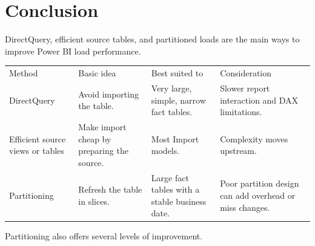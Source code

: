 \documentclass[10pt,openany,10pt]{book}
\newcounter{none}
\let\podeToprule\toprule
\let\podeMidrule\midrule
\let\podeBottomrule\bottomrule
\renewcommand{\toprule}{\arrayrulecolor{pbiGrid}\podeToprule}
\renewcommand{\midrule}{\arrayrulecolor{pbiGrid}\podeMidrule}
\renewcommand{\bottomrule}{\arrayrulecolor{pbiGrid}\podeBottomrule}
\begin{document}
\section{Conclusion}\label{conclusion-5}

DirectQuery, efficient source tables, and partitioned loads are the main
ways to improve Power BI load performance.

{\def\LTcaptype{none} %
\begin{longtable}[]{@{}
  >{\raggedright\arraybackslash}p{}
  >{\raggedright\arraybackslash}p{}
  >{\raggedright\arraybackslash}p{}
  >{\raggedright\arraybackslash}p{}@{}}
\toprule\noalign{}
\begin{minipage}[b]{\linewidth}\raggedright
Method
\end{minipage} & \begin{minipage}[b]{\linewidth}\raggedright
Basic idea
\end{minipage} & \begin{minipage}[b]{\linewidth}\raggedright
Best suited to
\end{minipage} & \begin{minipage}[b]{\linewidth}\raggedright
Consideration
\end{minipage} \\
\midrule\noalign{}
\endhead
\bottomrule\noalign{}
\endlastfoot
DirectQuery & Avoid importing the table. & Very large, simple, narrow
fact tables. & Slower report interaction and DAX limitations. \\
Efficient source views or tables & Make import cheap by preparing the
source. & Most Import models. & Complexity moves upstream. \\
Partitioning & Refresh the table in slices. & Large fact tables with a
stable business date. & Poor partition design can add overhead or miss
changes. \\
\end{longtable}
}

Partitioning also offers several levels of improvement.
\end{document}
